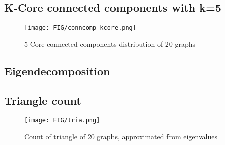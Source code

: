 \subsection{K-Core connected components with k=5}
\begin{figure}[H]
\begin{center}
\texttt{[image: FIG/conncomp-kcore.png]}
\caption{5-Core connected components distribution of 20 graphs}
\end{center}
\end{figure}

\subsection{Eigendecomposition}
\subsection{Triangle count}
\begin{figure}[H]
\begin{center}
\texttt{[image: FIG/tria.png]}
\caption{Count of triangle of 20 graphs, approximated from eigenvalues}
\end{center}
\end{figure}